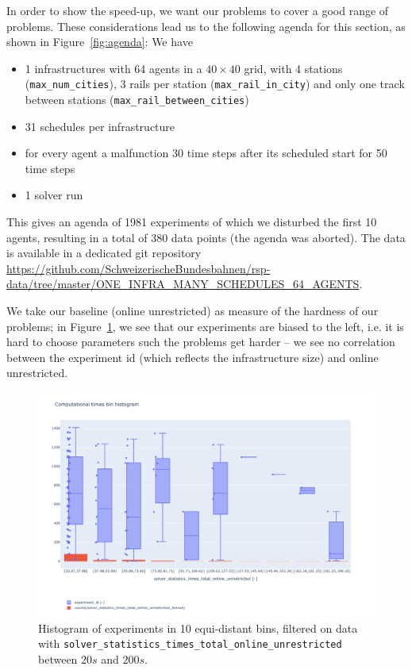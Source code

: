\documentclass{article}
\begin{document}
In order to show the speed-up, we want our problems to cover a good range of problems.
These considerations lead us  to the following agenda for this section, as shown in Figure~\ref{fig:agenda}: We have
\begin{itemize}
    \item 1 infrastructures with 64 agents in a $40\times 40$ grid, with 4 stations (\texttt{max\_num\_cities}), 3 rails per station (\texttt{max\_rail\_in\_city}) and only one track between stations (\texttt{max\_rail\_between\_cities})
    \item 31 schedules per infrastructure
    \item for every agent a malfunction 30 time steps after its scheduled start for 50 time steps
    \item 1 solver run
\end{itemize}
This gives an agenda of 1981 experiments of which we disturbed the first 10 agents, resulting in a total of 380 data points (the agenda was aborted).
The data is available in a dedicated git repository \url{https://github.com/SchweizerischeBundesbahnen/rsp-data/tree/master/ONE_INFRA_MANY_SCHEDULES_64_AGENTS}.
%

We take our  baseline (online unrestricted) as  measure of the hardness of our problems; in Figure~\ref{fig:agenda_histogram}, we see that our experiments are biased to the left, i.e. it is hard to choose parameters such the problems get harder -- we see no correlation between the experiment id (which reflects the infrastructure size) and online unrestricted.

\begin{figure}[hbtp]
    \includegraphics[width=\textwidth]{Figures/04_computational_results/times_total_histogram.pdf}
	\caption{Histogram of experiments in 10 equi-distant bins, filtered on data with \texttt{solver\_statistics\_times\_total\_online\_unrestricted} between $20s$ and $200s$.}
	\label{fig:agenda_histogram}
\end{figure}
\end{document}
